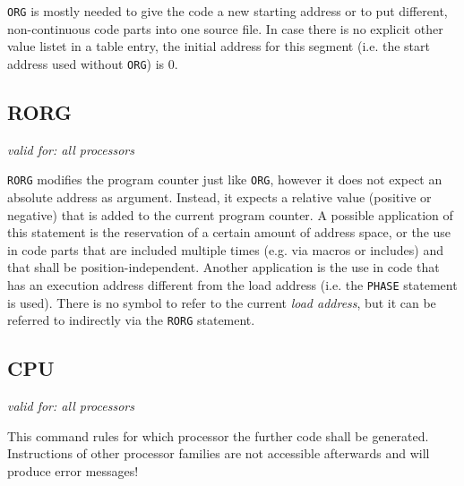 \documentclass[12pt,twoside]{report}
\makeatletter
\newcommand{\tty}[1]{{\tt #1}}
\newcommand{\ttindex}[1]{\index{#1@{\tt #1}}}
\makeatother
\begin{document}
\tty{ORG} is mostly needed to give the code a new starting address or to
put different, non-continuous code parts into one source file.  In case
there is no explicit other value listet in a table entry, the initial
address for this segment (i.e. the start address used without {\tt ORG})
is 0.


\subsection{RORG}
\label{SectRORG}
\ttindex{RORG}

{\em valid for: all processors}

\tty{RORG} modifies the program counter just like \tty{ORG},
however it does not expect an absolute address as argument.
Instead, it expects a relative value (positive or negative) that
is added to the current program counter.  A possible application
of this statement is the reservation of a certain amount of
address space, or the use in code parts that are included
multiple times (e.g. via macros or includes) and that shall be
position-independent.  Another application is the use in code
that has an execution address different from the load address
(i.e. the \tty{PHASE} statement is used).  There is no symbol to
refer to the current {\em load address}, but it can be referred
to indirectly via the \tty{RORG} statement.


\subsection{CPU}
\label{SectCPU}
\ttindex{CPU}


\newcommand{\cpu}{
 \stepcounter{cpucounter1}
 \ifnum\value{cpucounter1}>26
   \setcounter{cpucounter1}{1}
   \stepcounter{cpucounter2}
 \fi
 \ifnum\value{cpucounter2}>0\alph{cpucounter2}\fi\alph{cpucounter1})
}
\newenvironment{cpulist}
{
 \begin{quote}
 \begin{tabbing}
 \cpu \=
 }
{
 \end{tabbing}
 \end{quote}
}

{\em valid for: all processors}

This command rules for which processor the further code shall be
generated.  Instructions of other processor families are not
accessible afterwards and will produce error messages!
\end{document}
